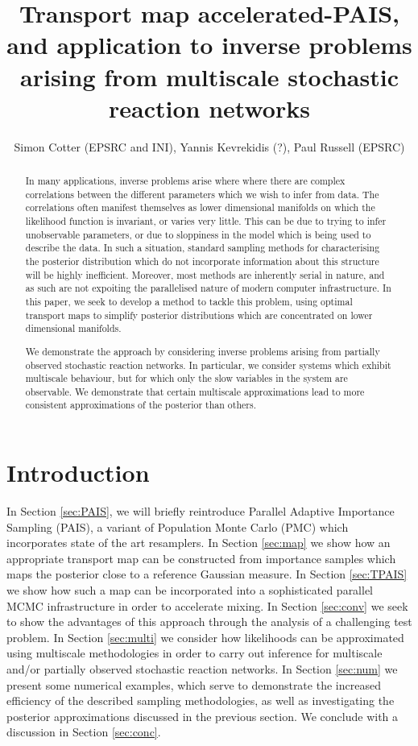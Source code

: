 \documentclass[final]{siamltex}
\title{Transport map accelerated-PAIS, and application to inverse problems arising from
  multiscale stochastic reaction networks}
\author{Simon Cotter (EPSRC and INI), Yannis Kevrekidis (?), Paul
  Russell (EPSRC)}
\begin{document}
\maketitle
\begin{abstract}
In many applications, inverse problems arise where where there are
complex correlations between the different parameters which we wish to
infer from data. The correlations often manifest themselves as lower
dimensional manifolds on which the likelihood function is
invariant, or varies very little. This can be due to trying to infer
unobservable parameters, or due to sloppiness in the model which is
being used to describe the data. In such a situation, standard
sampling methods for characterising the posterior distribution which
do not incorporate information about this structure will be highly
inefficient. Moreover, most methods are inherently serial in nature,
and as such are not expoiting the parallelised  nature of modern
computer infrastructure. In this paper, we seek to develop a method to
tackle this problem, using optimal transport maps to simplify
posterior distributions which are concentrated on lower dimensional
manifolds.

We demonstrate the approach by considering inverse problems arising
from partially observed stochastic reaction networks. In particular,
we consider systems which exhibit multiscale behaviour, but for which
only the slow variables in the system are observable. We demonstrate
that certain multiscale approximations lead to more consistent
approximations of the posterior than others.
\end{abstract}


\section{Introduction}

In Section \ref{sec:PAIS}, we will briefly reintroduce Parallel
Adaptive Importance Sampling (PAIS), a variant of Population Monte
Carlo (PMC) which incorporates state of the art resamplers. In Section \ref{sec:map} we show how an appropriate transport map can
be constructed from importance samples which maps the posterior close
to a reference Gaussian measure. In Section \ref{sec:TPAIS} we show
how such a map can be incorporated into a sophisticated parallel MCMC
infrastructure in order to accelerate mixing. In Section
\ref{sec:conv} we seek to show the advantages of this approach through
the analysis of a challenging test problem. In Section
\ref{sec:multi} we consider how likelihoods can be approximated using
 multiscale methodologies in order to carry out inference for
multiscale and/or partially observed stochastic reaction networks. In
Section \ref{sec:num} we present some numerical examples, which serve
to demonstrate the increased efficiency of the described sampling
methodologies, as well as investigating the posterior approximations
discussed in the previous section. We conclude with a discussion in
Section \ref{sec:conc}.
\end{document}
